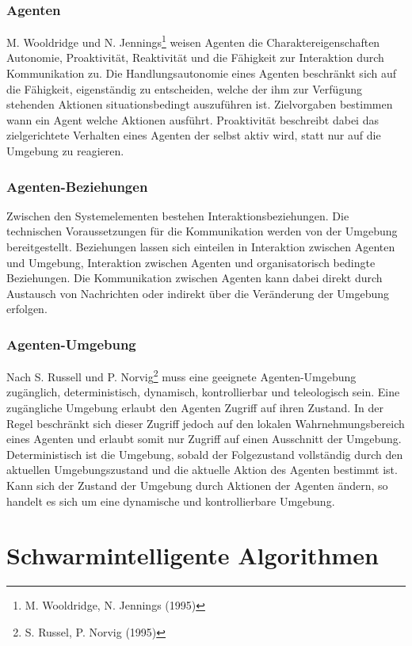\documentclass[a4paper, 11pt]{article}
\begin{document}
\subsubsection{Agenten} 
M. Wooldridge und N. Jennings\footnote{M. Wooldridge, N. Jennings (1995)} weisen Agenten die Charaktereigenschaften Autonomie, Proaktivität, Reaktivität und die Fähigkeit zur Interaktion durch Kommunikation zu. Die Handlungsautonomie eines Agenten beschränkt sich auf die Fähigkeit, eigenständig zu entscheiden, welche der ihm zur Verfügung stehenden Aktionen situationsbedingt auszuführen ist. Zielvorgaben bestimmen wann ein Agent welche Aktionen ausführt. Proaktivität beschreibt dabei das zielgerichtete Verhalten eines Agenten der selbst aktiv wird, statt nur auf die Umgebung zu reagieren.\newline
\subsubsection{Agenten-Beziehungen}
Zwischen den Systemelementen bestehen Interaktionsbeziehungen. Die technischen Voraussetzungen für die Kommunikation werden von der Umgebung bereitgestellt. Beziehungen lassen sich einteilen in Interaktion zwischen Agenten und Umgebung, Interaktion zwischen Agenten und organisatorisch bedingte Beziehungen. Die Kommunikation zwischen Agenten kann dabei direkt durch Austausch von Nachrichten oder indirekt über die Veränderung der Umgebung erfolgen.\newline
\subsubsection{Agenten-Umgebung}
Nach S. Russell und P. Norvig\footnote{S. Russel, P. Norvig (1995)} muss eine geeignete Agenten-Umgebung zugänglich, deterministisch, dynamisch, kontrollierbar und teleologisch sein. Eine zugängliche Umgebung erlaubt den Agenten Zugriff auf ihren Zustand. In der Regel beschränkt sich dieser Zugriff jedoch auf den lokalen Wahrnehmungsbereich eines Agenten und erlaubt somit nur Zugriff auf einen Ausschnitt der Umgebung. Deterministisch ist die Umgebung, sobald der Folgezustand vollständig durch den aktuellen Umgebungszustand und die aktuelle Aktion des Agenten bestimmt ist. Kann sich der Zustand der Umgebung durch Aktionen der Agenten ändern, so handelt es sich um eine dynamische und kontrollierbare Umgebung.
\newpage
\section{Schwarmintelligente Algorithmen}
\end{document}
